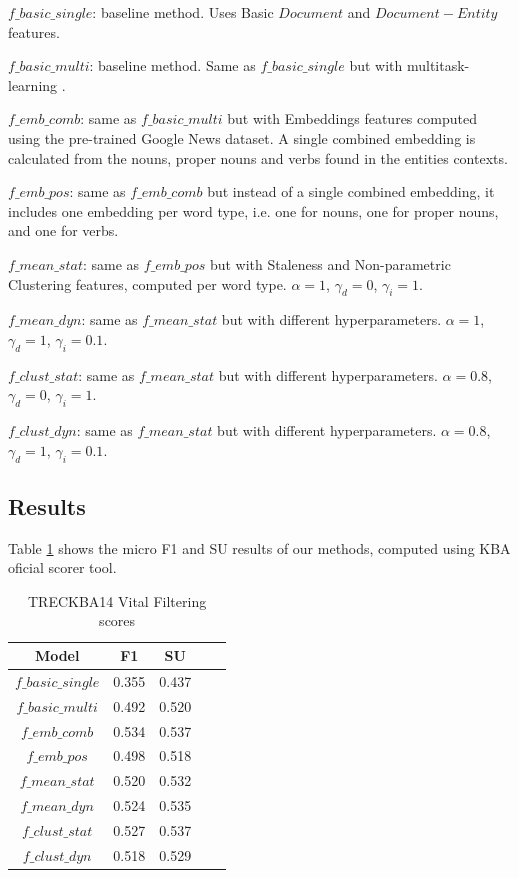 \documentclass{article}
\begin{document}
\begin{itemize*}
  \item $f\_basic\_single$: baseline method. Uses Basic $Document$ and $Document-Entity$ features.
  \item $f\_basic\_multi$: baseline method. Same as $f\_basic\_single$ but with multitask-learning \cite{Caruana93multitasklearning}.
  \item $f\_emb\_comb$: same as $f\_basic\_multi$ but with Embeddings features computed using the pre-trained Google News dataset. A single combined embedding is calculated from the nouns, proper nouns and verbs found in the entities contexts.
  \item $f\_emb\_pos$: same as $f\_emb\_comb$ but instead of a single combined embedding, it includes one embedding per word type, i.e. one for nouns, one for proper nouns, and one for verbs.
  \item $f\_mean\_stat$: same as $f\_emb\_pos$ but with Staleness and Non-parametric Clustering features, computed per word type. $\alpha = 1$, $\gamma_d = 0$, $\gamma_i = 1$.
  \item $f\_mean\_dyn$: same as $f\_mean\_stat$ but with different hyperparameters. $\alpha = 1$, $\gamma_d = 1$, $\gamma_i = 0.1$.
  \item $f\_clust\_stat$: same as $f\_mean\_stat$ but with different hyperparameters. $\alpha = 0.8$, $\gamma_d = 0$, $\gamma_i = 1$.
  \item $f\_clust\_dyn$: same as $f\_mean\_stat$ but with different hyperparameters. $\alpha = 0.8$, $\gamma_d = 1$, $\gamma_i = 0.1$.
\end{itemize*}

\subsection{Results}

Table \ref{res} shows the micro F1 and SU results of our methods, computed using KBA oficial scorer tool.

\begin{table}[H]
\center
\begin{tabular}{|c|c|c|c|c|} \hline
\textbf{Model} & \textbf{F1} & \textbf{SU} \\ \hline\hline
$f\_basic\_single$ & 0.355 & 0.437 \\ \hline
$f\_basic\_multi$ & 0.492 & 0.520 \\ \hline
$f\_emb\_comb$ & 0.534 & 0.537 \\ \hline
$f\_emb\_pos$ & 0.498 & 0.518 \\ \hline
$f\_mean\_stat$ & 0.520 & 0.532 \\ \hline
$f\_mean\_dyn$ & 0.524 & 0.535 \\ \hline
$f\_clust\_stat$ & 0.527 & 0.537 \\ \hline
$f\_clust\_dyn$ & 0.518 & 0.529 \\ \hline
\end{tabular}
\caption{TRECKBA14 Vital Filtering scores}
\label{res}
\end{table}
\end{document}
